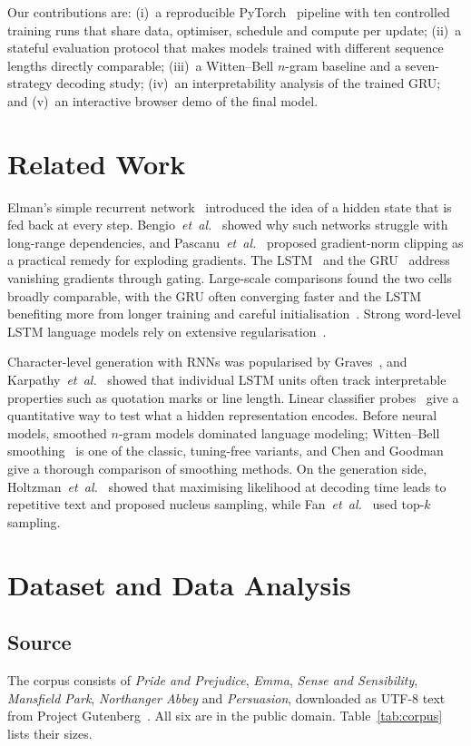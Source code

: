\documentclass[journal,a4paper]{IEEEtran}
\begin{document}
Our contributions are: (i)~a reproducible PyTorch~\cite{paszke2019} pipeline with ten controlled training runs that share data, optimiser, schedule and compute per update; (ii)~a stateful evaluation protocol that makes models trained with different sequence lengths directly comparable; (iii)~a Witten--Bell $n$-gram baseline and a seven-strategy decoding study; (iv)~an interpretability analysis of the trained GRU; and (v)~an interactive browser demo of the final model.

\section{Related Work}
Elman's simple recurrent network~\cite{elman1990} introduced the idea of a hidden state that is fed back at every step. Bengio~\textit{et~al.}~\cite{bengio1994} showed why such networks struggle with long-range dependencies, and Pascanu~\textit{et~al.}~\cite{pascanu2013} proposed gradient-norm clipping as a practical remedy for exploding gradients. The LSTM~\cite{hochreiter1997lstm} and the GRU~\cite{cho2014gru} address vanishing gradients through gating. Large-scale comparisons found the two cells broadly comparable, with the GRU often converging faster and the LSTM benefiting more from longer training and careful initialisation~\cite{chung2014,jozefowicz2015}. Strong word-level LSTM language models rely on extensive regularisation~\cite{merity2018}.

Character-level generation with RNNs was popularised by Graves~\cite{graves2013}, and Karpathy~\textit{et~al.}~\cite{karpathy2015} showed that individual LSTM units often track interpretable properties such as quotation marks or line length. Linear classifier probes~\cite{alain2016probes} give a quantitative way to test what a hidden representation encodes. Before neural models, smoothed $n$-gram models dominated language modeling; Witten--Bell smoothing~\cite{witten1991} is one of the classic, tuning-free variants, and Chen and Goodman~\cite{chen1999} give a thorough comparison of smoothing methods. On the generation side, Holtzman~\textit{et~al.}~\cite{holtzman2020} showed that maximising likelihood at decoding time leads to repetitive text and proposed nucleus sampling, while Fan~\textit{et~al.}~\cite{fan2018} used top-$k$ sampling.

\section{Dataset and Data Analysis}
\subsection{Source}
The corpus consists of \textit{Pride and Prejudice}, \textit{Emma}, \textit{Sense and Sensibility}, \textit{Mansfield Park}, \textit{Northanger Abbey} and \textit{Persuasion}, downloaded as UTF-8 text from Project Gutenberg~\cite{gutenberg}. All six are in the public domain. Table~\ref{tab:corpus} lists their sizes.
\end{document}
